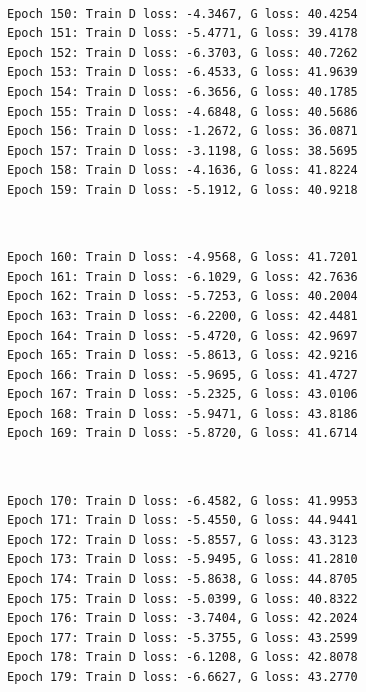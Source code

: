 \documentclass[11pt]{article}
\begin{document}
    \begin{center}
    \end{center}
    { \hspace*{\fill} \\}
    
    \begin{Verbatim}[commandchars=\\\{\}]
Epoch 150: Train D loss: -4.3467, G loss: 40.4254
Epoch 151: Train D loss: -5.4771, G loss: 39.4178
Epoch 152: Train D loss: -6.3703, G loss: 40.7262
Epoch 153: Train D loss: -6.4533, G loss: 41.9639
Epoch 154: Train D loss: -6.3656, G loss: 40.1785
Epoch 155: Train D loss: -4.6848, G loss: 40.5686
Epoch 156: Train D loss: -1.2672, G loss: 36.0871
Epoch 157: Train D loss: -3.1198, G loss: 38.5695
Epoch 158: Train D loss: -4.1636, G loss: 41.8224
Epoch 159: Train D loss: -5.1912, G loss: 40.9218

    \end{Verbatim}

    \begin{center}
    \end{center}
    { \hspace*{\fill} \\}
    
    \begin{Verbatim}[commandchars=\\\{\}]
Epoch 160: Train D loss: -4.9568, G loss: 41.7201
Epoch 161: Train D loss: -6.1029, G loss: 42.7636
Epoch 162: Train D loss: -5.7253, G loss: 40.2004
Epoch 163: Train D loss: -6.2200, G loss: 42.4481
Epoch 164: Train D loss: -5.4720, G loss: 42.9697
Epoch 165: Train D loss: -5.8613, G loss: 42.9216
Epoch 166: Train D loss: -5.9695, G loss: 41.4727
Epoch 167: Train D loss: -5.2325, G loss: 43.0106
Epoch 168: Train D loss: -5.9471, G loss: 43.8186
Epoch 169: Train D loss: -5.8720, G loss: 41.6714

    \end{Verbatim}

    \begin{center}
    \end{center}
    { \hspace*{\fill} \\}
    
    \begin{Verbatim}[commandchars=\\\{\}]
Epoch 170: Train D loss: -6.4582, G loss: 41.9953
Epoch 171: Train D loss: -5.4550, G loss: 44.9441
Epoch 172: Train D loss: -5.8557, G loss: 43.3123
Epoch 173: Train D loss: -5.9495, G loss: 41.2810
Epoch 174: Train D loss: -5.8638, G loss: 44.8705
Epoch 175: Train D loss: -5.0399, G loss: 40.8322
Epoch 176: Train D loss: -3.7404, G loss: 42.2024
Epoch 177: Train D loss: -5.3755, G loss: 43.2599
Epoch 178: Train D loss: -6.1208, G loss: 42.8078
Epoch 179: Train D loss: -6.6627, G loss: 43.2770

    \end{Verbatim}
\end{document}
